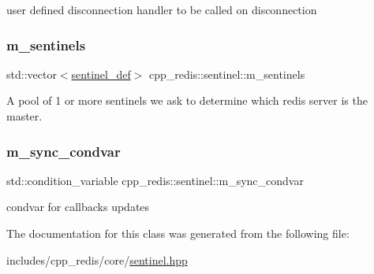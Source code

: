 user defined disconnection handler to be called on disconnection \mbox{\label{classcpp__redis_1_1sentinel_a3eea36960df4e9f8f7ef54c42a91e349}} 
\subsubsection{\texorpdfstring{m\+\_\+sentinels}{m\_sentinels}}
{\footnotesize\ttfamily std\+::vector$<$\hyperlink{classcpp__redis_1_1sentinel_1_1sentinel__def}{sentinel\+\_\+def}$>$ cpp\+\_\+redis\+::sentinel\+::m\+\_\+sentinels\hspace{0.3cm}{\ttfamily [private]}}

A pool of 1 or more sentinels we ask to determine which redis server is the master. \mbox{\label{classcpp__redis_1_1sentinel_a069c52d386173818d4c0656b242107dd}} 
\subsubsection{\texorpdfstring{m\+\_\+sync\+\_\+condvar}{m\_sync\_condvar}}
{\footnotesize\ttfamily std\+::condition\+\_\+variable cpp\+\_\+redis\+::sentinel\+::m\+\_\+sync\+\_\+condvar\hspace{0.3cm}{\ttfamily [private]}}

condvar for callbacks updates 

The documentation for this class was generated from the following file\+:\begin{DoxyCompactItemize}
\item 
includes/cpp\+\_\+redis/core/\hyperlink{sentinel_8hpp}{sentinel.\+hpp}\end{DoxyCompactItemize}
